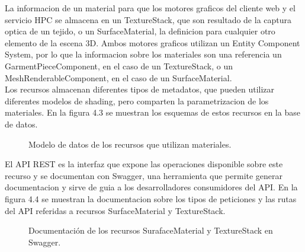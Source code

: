  La informacion de un material para que los motores graficos del cliente web y el servicio HPC se almacena en un
  TextureStack, que son resultado de la captura optica de un tejido, o un SurfaceMaterial, la definicion para
  cualquier otro elemento de la escena 3D. Ambos motores graficos utilizan un Entity Component System, por lo que
  la informacion sobre los materiales son una referencia un GarmentPieceComponent, en el caso de un TextureStack,
  o un MeshRenderableComponent, en el caso de un SurfaceMaterial.\\

  Los recursos almacenan diferentes tipos de metadatos, que pueden utilizar diferentes modelos de shading, pero
  comparten la parametrizacion de los materiales. En la figura 4.3 se muestran los esquemas de estos recursos en la
  base de datos.

  \begin{figure}[H]
    \vspace{0.5cm}
    \centering
    \caption{Modelo de datos de los recursos que utilizan materiales.}
    \vspace{1cm}
  \end{figure}

  El API REST es la interfaz que expone las operaciones disponible sobre este recurso y se documentan con Swagger,
  una herramienta que permite generar documentacion y sirve de guia a los desarrolladores consumidores del API. En
  la figura 4.4 se muestran la documentacion sobre los tipos de peticiones y las rutas del API referidas a recursos
  SurfaceMaterial y TextureStack.

  \begin{figure}[H]
    \vspace{1cm}
    \centering
    \caption{Documentaci\'on de los recursos SurafaceMaterial y TextureStack en Swagger.}
    \vspace{1cm}
  \end{figure}